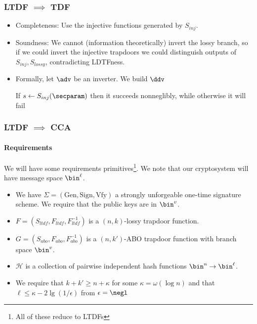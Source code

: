 \documentclass{beamer}
\begin{document}
\begin{frame}
    \frametitle{LTDF $\implies$ TDF}
    \begin{itemize}
        \item Completeness: Use the injective functions generated by $S_{inj}$.
        \item Soundness: We cannot (information theoretically) invert the lossy branch,
              so if we could invert the injective trapdoors we could distinguish outputs
              of $S_{inj}, S_{lossy}$, contradicting LDTFness.
        \item Formally, let $\adv$ be an inverter. We build $\ddv$
              \begin{pchstack}[center]
              \end{pchstack}
              If $s \leftarrow S_{inj}(\secparam)$ then it succeeds nonneglibly, while otherwise it will fail
    \end{itemize}
\end{frame}



\begin{frame}
    \frametitle{LTDF $\implies$ CCA}
    \framesubtitle{Requirements}
    We will have some requirements primitives\footnote{All of these reduce to LTDFs}.
    We note that our cryptosystem will have message space $\bin^\ell$.
    \begin{itemize}
        \item We have $\Sigma = (\mathrm{Gen}, \mathrm{Sign}, \mathrm{Vfy})$ a strongly unforgeable one-time signature scheme. We require that the public keys are in $\bin^v$.
        \item $F = (S_{ltdf}, F_{ltdf}, F^{-1}_{ltdf})$ is a $(n, k)$-lossy trapdoor function.
        \item $G = (S_{abo}, F_{abo}, F^{-1}_{abo})$ is a $(n, k')$-ABO trapdoor function with branch space $\bin^v$.
        \item $\mathcal{H}$ is a collection of pairwise independent hash functions $\bin^n \to \bin^\ell$.
        \item We require that $k + k' \geq n + \kappa$ for some $\kappa = \omega(\log n)$ and that $\ell \leq \kappa - 2 \lg(1/\epsilon)$ from $\epsilon = \negl$
    \end{itemize}
\end{frame}
\end{document}
